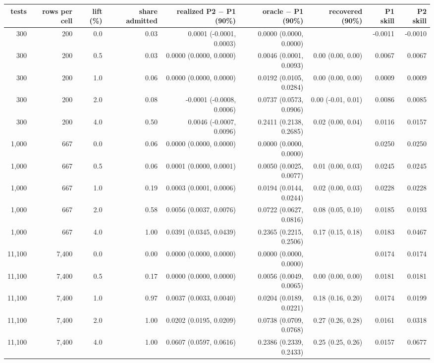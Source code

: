 \begin{tabular}{rrrrrrrrr}
\toprule
tests & rows per cell & lift (\%) & share admitted & realized P2 $-$ P1 (90\%) & oracle $-$ P1 (90\%) & recovered (90\%) & P1 skill & P2 skill \\
\midrule
300 & 200 & 0.0 & 0.03 & 0.0001 (-0.0001, 0.0003) & 0.0000 (0.0000, 0.0000) &  & -0.0011 & -0.0010 \\
300 & 200 & 0.5 & 0.03 & 0.0000 (0.0000, 0.0000) & 0.0046 (0.0001, 0.0093) & 0.00 (0.00, 0.00) & 0.0067 & 0.0067 \\
300 & 200 & 1.0 & 0.06 & 0.0000 (0.0000, 0.0000) & 0.0192 (0.0105, 0.0284) & 0.00 (0.00, 0.00) & 0.0009 & 0.0009 \\
300 & 200 & 2.0 & 0.08 & -0.0001 (-0.0008, 0.0006) & 0.0737 (0.0573, 0.0906) & 0.00 (-0.01, 0.01) & 0.0086 & 0.0085 \\
300 & 200 & 4.0 & 0.50 & 0.0046 (-0.0007, 0.0096) & 0.2411 (0.2138, 0.2685) & 0.02 (0.00, 0.04) & 0.0116 & 0.0157 \\
1,000 & 667 & 0.0 & 0.06 & 0.0000 (0.0000, 0.0000) & 0.0000 (0.0000, 0.0000) &  & 0.0250 & 0.0250 \\
1,000 & 667 & 0.5 & 0.06 & 0.0001 (0.0000, 0.0001) & 0.0050 (0.0025, 0.0077) & 0.01 (0.00, 0.03) & 0.0245 & 0.0245 \\
1,000 & 667 & 1.0 & 0.19 & 0.0003 (0.0001, 0.0006) & 0.0194 (0.0144, 0.0244) & 0.02 (0.00, 0.03) & 0.0228 & 0.0228 \\
1,000 & 667 & 2.0 & 0.58 & 0.0056 (0.0037, 0.0076) & 0.0722 (0.0627, 0.0816) & 0.08 (0.05, 0.10) & 0.0185 & 0.0193 \\
1,000 & 667 & 4.0 & 1.00 & 0.0391 (0.0345, 0.0439) & 0.2365 (0.2215, 0.2506) & 0.17 (0.15, 0.18) & 0.0183 & 0.0467 \\
11,100 & 7,400 & 0.0 & 0.00 & 0.0000 (0.0000, 0.0000) & 0.0000 (0.0000, 0.0000) &  & 0.0174 & 0.0174 \\
11,100 & 7,400 & 0.5 & 0.17 & 0.0000 (0.0000, 0.0000) & 0.0056 (0.0049, 0.0065) & 0.00 (0.00, 0.00) & 0.0181 & 0.0181 \\
11,100 & 7,400 & 1.0 & 0.97 & 0.0037 (0.0033, 0.0040) & 0.0204 (0.0189, 0.0221) & 0.18 (0.16, 0.20) & 0.0174 & 0.0199 \\
11,100 & 7,400 & 2.0 & 1.00 & 0.0202 (0.0195, 0.0209) & 0.0738 (0.0709, 0.0768) & 0.27 (0.26, 0.28) & 0.0161 & 0.0318 \\
11,100 & 7,400 & 4.0 & 1.00 & 0.0607 (0.0597, 0.0616) & 0.2386 (0.2339, 0.2433) & 0.25 (0.25, 0.26) & 0.0157 & 0.0677 \\
\bottomrule
\end{tabular}
